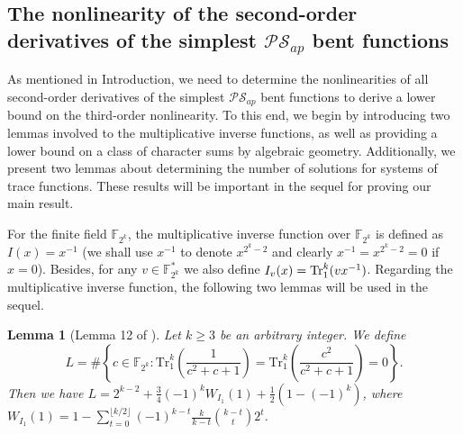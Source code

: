 \documentclass[preprint,10pt]{elsarticle}
\newcommand{\F}{\mathbb{F}}
\newcommand{\0}{\textbf{0}}
\newcommand{\1}{\textbf{1}}
\theoremstyle{plain}
\newtheorem{lemma}{Lemma}
\begin{document}
    \subsection{The nonlinearity of the second-order derivatives of the simplest $\mathcal{PS}_{ap}$ bent functions}
    As mentioned in Introduction,
    we need to determine the nonlinearities of all second-order derivatives of the simplest $\mathcal{PS}_{ap}$ bent functions to derive a lower bound on the third-order nonlinearity.
    To this end, we begin by introducing two lemmas involved to the multiplicative inverse functions,
    as well as providing a lower bound on a class of character sums by algebraic geometry.
    Additionally, we present two lemmas about determining the number of solutions for systems of trace functions.
    These results will be important in the sequel for proving our main result.

    For the finite field $\F_{2^k}$, the multiplicative inverse function over $\F_{2^k}$ is defined as $I(x)=x^{-1}$ (we shall use $x^{-1}$ to denote $x^{2^k-2}$ and clearly $x^{-1}=x^{2^k-2}=0$ if $x=0$).
    Besides, for any $v\in\F_{2^k}^*$ we also define $I_v(x)=\Tr_1^k(vx^{-1})$.
    Regarding the multiplicative inverse function, the following two lemmas will be used in the sequel.

    \begin{lemma}[Lemma 12 of \cite{TangMM2022inversefunction}]\label{L:SumInv00}
        Let $k\geq 3$ be an arbitrary integer.
        We define
        $$L=\#\left\{c\in\F_{2^k}  :  \mathrm{Tr}_1^k\left(\frac{1}{c^2+c+1}\right)=\mathrm{Tr}_1^k\left(\frac{c^2}{c^2+c+1}\right)=0\right\}.$$
        Then we have $L=2^{k-2}+\frac{3}{4}(-1)^kW_{I_1}(1)+\frac{1}{2}\left(1-(-1)^k\right)$, where $W_{I_1}(1)=1-\sum_{t=0}^{\lfloor k/2\rfloor}(-1)^{k-t}\frac{k}{k-t}{{k-t}\choose {t}}2^t$.
    \end{lemma}
\end{document}
